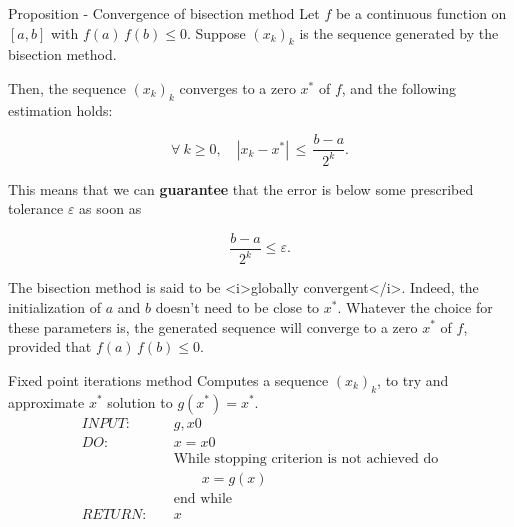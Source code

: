 \documentclass{article}
\begin{document}
        \vspace{10pt}

        \begin{theorem}{Proposition - Convergence of bisection method}
            Let $f$ be a continuous function on $[a,b]$ with $f(a)\,f(b)\leq0$. Suppose $(x_k)_k$ is the sequence generated by the bisection method. 

            Then, the sequence $(x_k)_k$ converges to a zero $x^*$ of $f$, and the following estimation holds:
            
            $$
            \forall~k\geq 0,\quad{} |x_k-x^*|\,\leq\,\frac{b-a}{2^k}.
            $$
            
            This means that we can \textbf{guarantee} that the error is below some prescribed tolerance $\varepsilon$ as soon as

            $$\frac{b-a}{2^k}\leq \varepsilon.$$
        \end{theorem}

        \vspace{10pt}

        \begin{remark}
            The bisection method is said to be <i>globally convergent</i>. Indeed, the initialization of $a$ and $b$ doesn't need to be close to $x^*$. Whatever the choice for these parameters is, the generated sequence will converge to a zero $x^*$ of $f$, provided that $f(a)\,f(b)\leq 0$.
        \end{remark}

        \begin{algo}{Fixed point iterations method}
            Computes a sequence $(x_k)_k$, to try and approximate $x^*$ solution to $g(x^*)=x^*$.
                \begin{align*}
                INPUT:&\quad{} g, x0\\
                DO:&\quad{} x = x0\\
                &\quad{} \text{While stopping criterion is not achieved do}\\
                &\quad{}\quad{}\quad{} x = g(x)\\
                &\quad{} \text{end while}\\
                RETURN:&\quad{} x\\
                \end{align*}
        \end{algo}

        \vspace{10pt}
\end{document}
